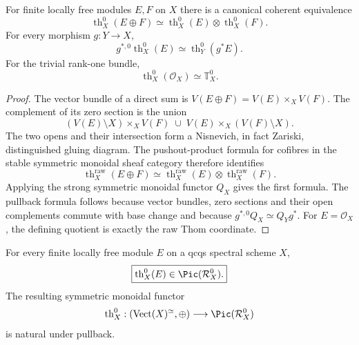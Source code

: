 \begin{proposition}
\label{prop:bn-diff-differential-thom-additivity}
For finite locally free modules \(E,F\) on \(X\) there is a canonical coherent
equivalence
\[
  \boxed{
  \operatorname{th}^0_X(E\oplus F)
  \simeq
  \operatorname{th}^0_X(E)\otimes
  \operatorname{th}^0_X(F).
  }
\]
For every morphism \(g:Y\to X\),
\[
  \boxed{
  g^{*,0}\operatorname{th}^0_X(E)
  \simeq
  \operatorname{th}^0_Y(g^*E).
  }
\]
For the trivial rank-one bundle,
\[
  \operatorname{th}^0_X(\mathcal O_X)
  \simeq
  \mathbb T_X^0.
\]
\end{proposition}

\begin{proof}
The vector bundle of a direct sum is
\(V(E\oplus F)=V(E)\times_XV(F)\).  The complement of its zero section is the
union
\[
  (V(E)\setminus X)\times_XV(F)
  \;\cup\;
  V(E)\times_X(V(F)\setminus X).
\]
The two opens and their intersection form a Nisnevich, in fact Zariski,
distinguished gluing diagram.  The pushout-product formula for cofibres in the
stable symmetric monoidal sheaf category therefore identifies
\[
  \operatorname{th}^{\mathrm{raw}}_X(E\oplus F)
  \simeq
  \operatorname{th}^{\mathrm{raw}}_X(E)
  \otimes
  \operatorname{th}^{\mathrm{raw}}_X(F).
\]
Applying the strong symmetric monoidal functor \(Q_X\) gives the first formula.
The pullback formula follows because vector bundles, zero sections and their
open complements commute with base change and because
\(g^{*,0}Q_X\simeq Q_Yg^*\).  For \(E=\mathcal O_X\), the defining quotient is
exactly the raw Thom coordinate.
\end{proof}

\begin{theorem}
\label{thm:bn-diff-differential-thom-invertibility}
For every finite locally free module \(E\) on a qcqs spectral scheme \(X\),
\[
  \boxed{
  \operatorname{th}^0_X(E)
  \in
  \Pic(\mathcal R_X^0).
  }
\]
The resulting symmetric monoidal functor
\[
  \operatorname{th}^0_X:
  (\operatorname{Vect}(X)^\simeq,\oplus)
  \longrightarrow
  \Pic(\mathcal R_X^0)
\]
is natural under pullback.
\end{theorem}

